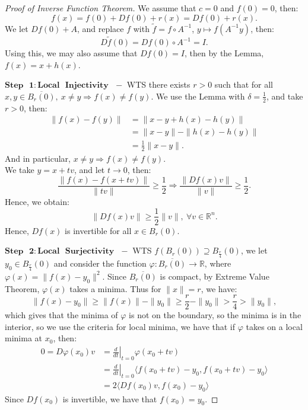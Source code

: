 \documentclass[11pt]{article}
\theoremstyle{quiet}
\theoremstyle{quietremark}
\begin{document}
\begin{proof}[Proof of Inverse Function Theorem]
We assume that $c=0$ and $f(0)=0$, then:
\[
f(x)=f(0)+Df(0)+r(x)=Df(0)+r(x).
\]
We let $Df(0)+A$, and replace $f$ with $\tilde f=f\circ A^{-1}$, $y\mapsto f(A^{-1}y)$, then:
\[
D\tilde f(0)=Df(0)\circ A^{-1}=I.
\]
Using this, we may also assume that $Df(0)=I$, then by the Lemma, $f(x)=x+h(x)$.

$\mathbf{Step\text{ }1: Local\text{ } Injectivity} \text{ }-$ WTS there exists $r>0$ such that for all $x,y\in\overline{B_r(0)},~x\ne y\Rightarrow f(x)\ne f(y).$ We use the Lemma with $\displaystyle\delta=\frac{1}{2}$, and take $r>0$, then:
\[
\begin{aligned}
\|f(x)-f(y)\|&=\|x-y+h(x)-h(y)\|\\
&=\|x-y\|-\|h(x)-h(y)\|\\
&=\frac{1}{2}\|x-y\|.
\end{aligned}
\]
And in particular, $x\ne y\Rightarrow f(x)\ne f(y)$.\\
We take $y=x+tv$, and let $t\to 0$, then:
\[
\frac{\|f(x)-f(x+tv)\|}{\|tv\|}\ge \frac{1}{2}\Rightarrow\frac{\|Df(x)v\|}{\|v\|}\ge \frac{1}{2}.
\]
Hence, we obtain:
\[
\|Df(x)v\|\ge \frac{1}{2}\|v\|,~\forall v\in\mathbb{R}^n.
\]
Hence, $Df(x)$ is invertible for all $x\in B_r(0)$.

$\mathbf{Step\text{ }2: Local\text{ }Surjectivity\text{ }-}$ WTS $f(B_r(0))\supseteq B_{\frac{r}{4}}(0)$, we let $y_0\in B_{\frac{r}{4}}(0)$ and consider the function $\varphi:\overline{B_r(0)}\to\mathbb{R}$, where $\varphi(x)=\|f(x)-y_0\|^2$. Since $\overline{B_r(0)}$ is compact, by Extreme Value Theorem, $\varphi(x)$ takes a minima. Thus for $\|x\|=r$, we have:
\[
\|f(x)-y_0\|\ge \|f(x)\|-\|y_0\|\ge \frac{r}{2}-\|y_0\|>\frac{r}{4}>\|y_0\|,
\]
which gives that the minima of $\varphi$ is not on the boundary, so the minima is in the interior, so we use the criteria for local minima, we have that if $\varphi$ takes on a local minima at $x_0$, then:
\[
\begin{aligned}
0=D\varphi(x_0)v&=\left.\frac{d}{dt}\right |_{t=0}\varphi(x_0+tv)\\
&=\left.\frac{d}{dt}\right |_{t=0}\langle f(x_0+tv)-y_0,f(x_0+tv)-y_0\rangle\\
&=2\langle Df(x_0)v,f(x_0)-y_0\rangle
\end{aligned}
\]
Since $Df(x_0)$ is invertible, we have that $f(x_0)=y_0$.
\end{proof}
\newpage
\end{document}
